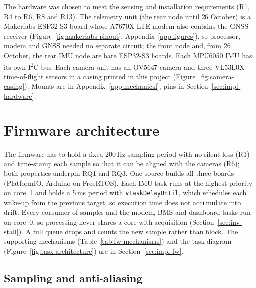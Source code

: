 The hardware was chosen to meet the sensing and installation requirements (R1, R4 to R6, R8 and R13). The telemetry unit (the rear node until 26 October) is a Makerfabs ESP32-S3 board whose A7670X LTE modem also contains the GNSS receiver \cite{makerfabsa7670x} (Figure~\ref{fig:makerfabs-pinout}, Appendix~\ref{app:figures}), so processor, modem and GNSS needed no separate circuit; the front node and, from 26 October, the rear IMU node are bare ESP32-S3 boards. Each MPU6050 IMU has its own I\textsuperscript{2}C bus. Each camera unit has an OV5647 camera and three VL53L0X time-of-flight sensors in a casing printed in this project (Figure~\ref{fig:camera-casing}). Mounts are in Appendix~\ref{app:mechanical}, pins in Section~\ref{sec:impl-hardware}.

\section{Firmware architecture}
\label{sec:dual-imu-architecture}
\label{sec:acquisition-instrumentation}
\label{sec:raw-stream}
\label{sec:imu-health}
\label{sec:front-node}

The firmware has to hold a fixed 200\,Hz sampling period with no silent loss (R1) and time-stamp each sample so that it can be aligned with the cameras (R6); both properties underpin RQ1 and RQ3. One source builds all three boards (PlatformIO, Arduino on FreeRTOS). Each IMU task runs at the highest priority on core~1 and holds a 5\,ms period with \texttt{vTaskDelayUntil}, which schedules each wake-up from the previous target, so execution time does not accumulate into drift. Every consumer of samples and the modem, BMS and dashboard tasks run on core~0, so processing never shares a core with acquisition (Section~\ref{sec:inv-stall}). A full queue drops and counts the new sample rather than block. The supporting mechanisms (Table~\ref{tab:fw-mechanisms}) and the task diagram (Figure~\ref{fig:task-architecture}) are in Section~\ref{sec:impl-fw}.

\subsection{Sampling and anti-aliasing}
\label{sec:sampling}

